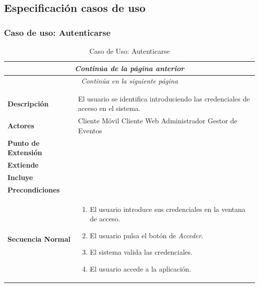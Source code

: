 \newpage
\subsection{Especificación casos de uso}


\subsubsection*{Caso de uso: Autenticarse}
\begin{longtable}{| p{4cm} | p{10cm} |}
\endfirsthead
\multicolumn{2}{c}{\textit{Continúa de la página anterior}}\\[12pt]
\hline
\endhead
\hline
\multicolumn{2}{c}{\textit{Continúa en la siguiente página}} \\
\endfoot
\hline
\caption{Caso de Uso: Autenticarse}\label{fig:1}\\
\endlastfoot


\hline
\multicolumn{2}{|c|}{\textbf{CU$<$01$>$ - Autenticarse}} \\

\hline
\textbf{Descripción} &
El usuario se identifica introduciendo las credenciales de acceso en el sistema. \\

\hline
\textbf{Actores} &
Cliente Móvil\newline
Cliente Web\newline
Administrador\newline
Gestor de Eventos\\

\hline
\textbf{Punto de Extensión} &
\\

\hline
\textbf{Extiende} &
\\

\hline
\textbf{Incluye} &
\\

\hline
\textbf{Precondiciones} &
\\

\hline
\textbf{Secuencia Normal} &\mbox{}\par\vspace{-\baselineskip}
\begin{enumerate}[leftmargin=0.7cm, topsep=0.1cm]
\item El usuario introduce sus credenciales en la ventana de acceso. 
\item El usuario pulsa el botón de \textit{Acceder}.
\item El sistema valida las credenciales.
\item El usuario accede a la aplicación.
\end{enumerate}\\


\end{longtable}
